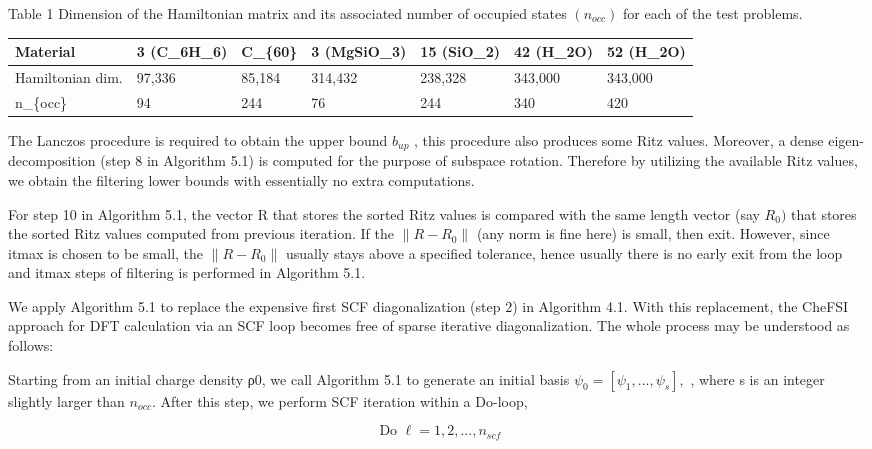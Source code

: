 \documentclass[
  10
]{article}
\newcounter{none} %
\begin{document}
Table 1 Dimension of the Hamiltonian matrix and its associated number of
occupied states \(( n _ { o c c } )\) for each of the test problems.

{\def\LTcaptype{none} %
\begin{longtable}[]{@{}|l|l|l|l|l|l|l|@{}}
\toprule\noalign{}
\endhead
\bottomrule\noalign{}
\endlastfoot
\hline
Material & 3 (C\_6H\_6) & C\_\{60\} & 3 (MgSiO\_3) & 15 (SiO\_2) & 42
(H\_2O) & 52 (H\_2O) \\
\hline
Hamiltonian dim. & 97,336 & 85,184 & 314,432 & 238,328 & 343,000 &
343,000 \\
\hline
n\_\{occ\} & 94 & 244 & 76 & 244 & 340 & 420 \\
\hline
\end{longtable}
}

The Lanczos procedure is required to obtain the upper bound
\(b _ { u p }\) , this procedure also produces some Ritz values.
Moreover, a dense eigen-decomposition (step 8 in Algorithm 5.1) is
computed for the purpose of subspace rotation. Therefore by utilizing
the available Ritz values, we obtain the filtering lower bounds with
essentially no extra computations.

For step 10 in Algorithm 5.1, the vector R that stores the sorted Ritz
values is compared with the same length vector (say \(R _ { 0 } )\) that
stores the sorted Ritz values computed from previous iteration. If the
\(\| R - R _ { 0 } \|\) (any norm is fine here) is small, then exit.
However, since itmax is chosen to be small, the \(\| R - R _ { 0 } \|\)
usually stays above a specified tolerance, hence usually there is no
early exit from the loop and itmax steps of filtering is performed in
Algorithm 5.1.

We apply Algorithm 5.1 to replace the expensive first SCF
diagonalization (step 2) in Algorithm 4.1. With this replacement, the
CheFSI approach for DFT calculation via an SCF loop becomes free of
sparse iterative diagonalization. The whole process may be understood as
follows:

Starting from an initial charge density ρ0, we call Algorithm 5.1 to
generate an initial basis
\(\psi _ { 0 } = [ \psi _ { 1 } , . . . , \psi _ { s } ] ,\) , where s
is an integer slightly larger than \(n _ { o c c } .\) After this step,
we perform SCF iteration within a Do-loop,

\[
\text { Do } \ell = 1, 2,..., n _ {s c f}
\]
\end{document}
